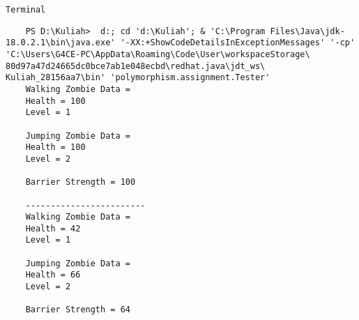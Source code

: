 \documentclass[12pt,titlepage]{article}
\begin{document}
\texttt{Terminal}
\begin{verbatim}
    PS D:\Kuliah>  d:; cd 'd:\Kuliah'; & 'C:\Program Files\Java\jdk-18.0.2.1\bin\java.exe' '-XX:+ShowCodeDetailsInExceptionMessages' '-cp' 'C:\Users\G4CE-PC\AppData\Roaming\Code\User\workspaceStorage\ 80d97a47d24665dc0bce7ab1e048ecbd\redhat.java\jdt_ws\ Kuliah_28156aa7\bin' 'polymorphism.assignment.Tester' 
    Walking Zombie Data = 
    Health = 100
    Level = 1
    
    Jumping Zombie Data = 
    Health = 100
    Level = 2
    
    Barrier Strength = 100
    
    ------------------------
    Walking Zombie Data =
    Health = 42
    Level = 1
    
    Jumping Zombie Data =
    Health = 66
    Level = 2
    
    Barrier Strength = 64
    
\end{verbatim}
\end{document}
